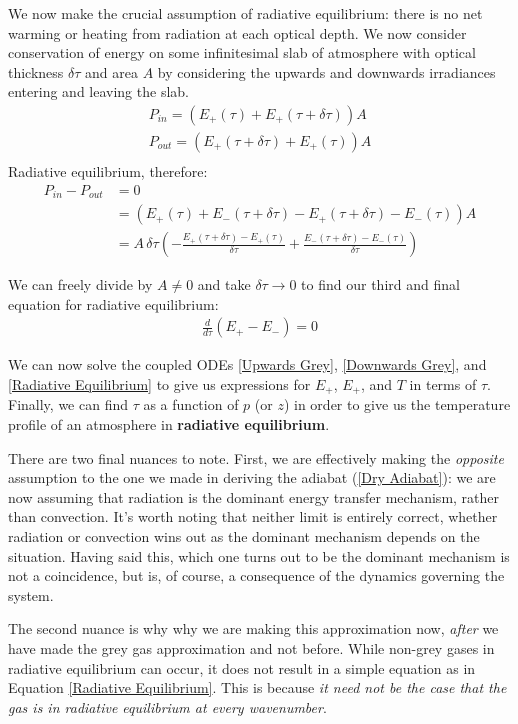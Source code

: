 We now make the crucial assumption of radiative equilibrium: there is no net warming or heating from radiation at each optical depth. We now consider conservation of energy on some infinitesimal slab of atmosphere with optical thickness $\delta \tau$ and area $A$ by considering the upwards and downwards irradiances entering and leaving the slab. 
\begin{align*}
    P_{in}=(E_+(\tau)+E_+(\tau+\delta\tau))A\\
    P_{out}=(E_+(\tau+\delta\tau)+E_+(\tau))A\\
\end{align*}
Radiative equilibrium, therefore:
\begin{align*}
    P_{in}-P_{out}&=0\\
    &= (E_+(\tau)+E_-(\tau+\delta\tau)-E_+(\tau+\delta\tau)-E_-(\tau))A\\
    &=A\,\delta\tau
    \left(-
    \frac{E_+(\tau+\delta\tau)-E_+(\tau)}{\delta \tau}
    +
    \frac{E_-(\tau+\delta\tau)-E_-(\tau)}{\delta \tau}
    \right)
\end{align*}

We can freely divide by $A\neq0$ and take $\delta\tau\to0$ to find our third and final equation for radiative equilibrium:
\begin{align}\label{Radiative Equilibrium}
    \frac{d}{d\tau}(E_+-E_-)=0
\end{align}

We can now solve the coupled ODEs \ref{Upwards Grey}, \ref{Downwards Grey}, and \ref{Radiative Equilibrium} to give us expressions for $E_+$, $E_+$, and $T$ in terms of $\tau$. Finally, we can find $\tau$ as a function of $p$ (or $z$) in order to give us the temperature profile of an atmosphere in \textbf{radiative equilibrium}. 

There are two final nuances to note. First, we are effectively making the \textit{opposite} assumption to the one we made in deriving the adiabat (\ref{Dry Adiabat}): we are now assuming that radiation is the dominant energy transfer mechanism, rather than convection. It's worth noting that neither limit is entirely correct, whether radiation or convection wins out as the dominant mechanism depends on the situation. Having said this, which one turns out to be the dominant mechanism is not a coincidence, but is, of course, a consequence of the dynamics governing the system.

The second nuance is why why we are making this approximation now, \textit{after} we have made the grey gas approximation and not before. While non-grey gases in radiative equilibrium can occur, it does not result in a simple equation as in Equation \ref{Radiative Equilibrium}. This is because \textit{it need not be the case that the gas is in radiative equilibrium at every wavenumber}. 

